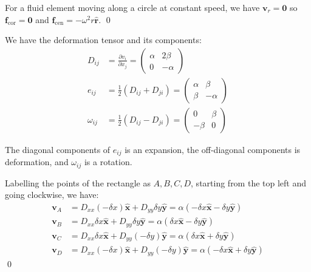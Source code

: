 \documentclass[12pt]{article}
\begin{document}
For a fluid element moving along a circle at constant speed, we have $\mathbf{v}_{r} = \mathbf{0}$ so $\mathbf{f}_{\text{cor}} = \mathbf{0}$ and $\mathbf{f}_{\text{cen}} = -\omega^{2} r \hat{\mathbf{r}}$.
\qed



We have the deformation tensor and its components:
\begin{equation}
    \begin{split}
        D_{ij} &= \frac{\partial v_{i}}{\partial x_{j}} =
        \begin{pmatrix}
            \alpha & 2\beta  \\
            0      & -\alpha
        \end{pmatrix} \\
        e_{ij} &= \frac{1}{2} (D_{ij} + D_{ji}) =
        \begin{pmatrix}
            \alpha & \beta   \\
            \beta  & -\alpha
        \end{pmatrix} \\
        \omega_{ij} &= \frac{1}{2} (D_{ij} - D_{ji}) =
        \begin{pmatrix}
            0      & \beta \\
            -\beta & 0
        \end{pmatrix}
    \end{split}
\end{equation}

The diagonal components of $e_{ij}$ is an expansion, the off-diagonal components is deformation, and $\omega_{ij}$ is a rotation.

Labelling the points of the rectangle as $A, B, C, D$, starting from the top left and going clockwise, we have:
\begin{equation}
    \begin{split}
        \mathbf{v}_{A} &= D_{xx} (-\delta x) \hat{\mathbf{x}} + D_{yy} \delta y \hat{\mathbf{y}} = \alpha (-\delta x \hat{\mathbf{x}} - \delta y \hat{\mathbf{y}}) \\
        \mathbf{v}_{B} &= D_{xx} \delta x \hat{\mathbf{x}} + D_{yy} \delta y \hat{\mathbf{y}} = \alpha (\delta x \hat{\mathbf{x}} - \delta y \hat{\mathbf{y}}) \\
        \mathbf{v}_{C} &= D_{xx} \delta x \hat{\mathbf{x}} + D_{yy} (-\delta y) \hat{\mathbf{y}} = \alpha (\delta x \hat{\mathbf{x}} + \delta y \hat{\mathbf{y}}) \\
        \mathbf{v}_{D} &= D_{xx} (-\delta x) \hat{\mathbf{x}} + D_{yy} (-\delta y) \hat{\mathbf{y}} = \alpha (-\delta x \hat{\mathbf{x}} + \delta y \hat{\mathbf{y}})
    \end{split}
\end{equation}
\qed
\end{document}
